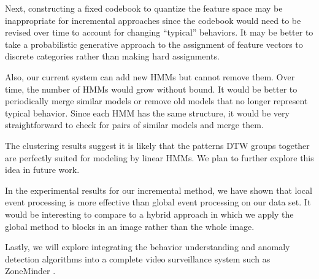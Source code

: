 Next, constructing a fixed codebook to quantize the feature space may
be inappropriate for incremental approaches since the codebook would
need to be revised over time to account for changing ``typical''
behaviors.  It may be better to take a probabilistic generative
approach to the assignment of feature vectors to discrete categories
rather than making hard assignments.

Also, our current system can add new HMMs but cannot remove them. Over
time, the number of HMMs would grow without bound.  It would be better
to periodically merge similar models or remove old models that no
longer represent typical behavior. Since each HMM has the same
structure, it would be very straightforward to check for pairs of
similar models and merge them.

The clustering results suggest it is likely that the patterns DTW
groups together are perfectly suited for modeling by linear HMMs. We
plan to further explore this idea in future work.

In the experimental results for our incremental method, we have shown
that local event processing is more effective than global event
processing on our data set.  It would be interesting to compare to a
hybrid approach in which we apply the global method to blocks in an
image rather than the whole image.  

Lastly, we will explore integrating the behavior understanding and
anomaly detection algorithms into a complete video surveillance system
such as ZoneMinder .

\FloatBarrier






